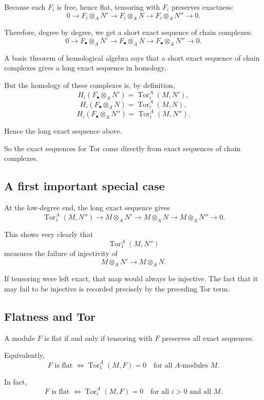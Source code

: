 \documentclass[12pt,a4paper]{article}
\theoremstyle{notespace}
\begin{document}
Because each \(F_i\) is free, hence flat, tensoring with \(F_i\) preserves exactness:
\[
0\to F_i\otimes_A N' \to F_i\otimes_A N \to F_i\otimes_A N'' \to 0.
\]

Therefore, degree by degree, we get a short exact sequence of chain complexes:
\[
0\to F_\bullet\otimes_A N'
\to F_\bullet\otimes_A N
\to F_\bullet\otimes_A N''
\to 0.
\]

A basic theorem of homological algebra says that a short exact sequence of chain complexes gives a long exact sequence in homology.

But the homology of these complexes is, by definition,
\[
H_i(F_\bullet\otimes_A N')=\operatorname{Tor}_i^A(M,N'),
\]
\[
H_i(F_\bullet\otimes_A N)=\operatorname{Tor}_i^A(M,N),
\]
\[
H_i(F_\bullet\otimes_A N'')=\operatorname{Tor}_i^A(M,N'').
\]

Hence the long exact sequence above.

So the exact sequences for Tor come directly from exact sequences of chain complexes.

\subsection{A first important special case}

At the low-degree end, the long exact sequence gives
\[
\operatorname{Tor}_1^A(M,N'')
\longrightarrow
M\otimes_A N'
\longrightarrow
M\otimes_A N
\longrightarrow
M\otimes_A N''
\to 0.
\]

This shows very clearly that
\[
\operatorname{Tor}_1^A(M,N'')
\]
measures the failure of injectivity of
\[
M\otimes_A N' \longrightarrow M\otimes_A N.
\]

If tensoring were left exact, that map would always be injective. The fact that it may fail to be injective is recorded precisely by the preceding Tor term.

\subsection{Flatness and Tor}

A module \(F\) is flat if and only if tensoring with \(F\) preserves all exact sequences.

Equivalently,
\[
F \text{ is flat }
\iff
\operatorname{Tor}_1^A(M,F)=0
\quad \text{for all } A\text{-modules } M.
\]

In fact,
\[
F \text{ is flat }
\iff
\operatorname{Tor}_i^A(M,F)=0
\quad \text{for all } i>0 \text{ and all } M.
\]
\end{document}
